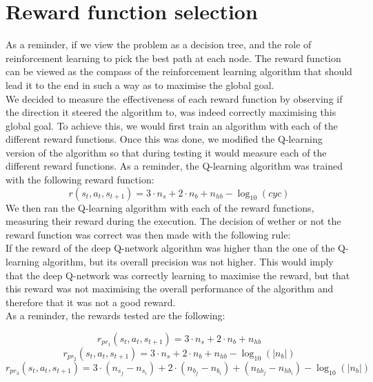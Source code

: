 \section{Reward function selection}
As a reminder, if we view the problem as a decision tree, and the role of reinforcement learning to pick the best path at each node. The reward function can be viewed as the compass of the reinforcement learning algorithm that should lead it to the end in such a way as to maximise the global goal.\\
We decided to measure the effectiveness of each reward function by observing if the direction it steered the algorithm to, was indeed correctly maximising this global goal. To achieve this, we would first train an algorithm with each of the different reward functions. Once this was done, we modified the Q-learning version of the algorithm so that during testing it would measure each of the different reward functions. As a reminder, the Q-learning algorithm was trained with the following reward function:
\begin{equation}
	r(s_t,a_t,s_{t+1}) = 3  \cdot n_s + 2 \cdot n_b + n_{hb} - \log_{10}(cyc)
\end{equation}
We then ran the Q-learning algorithm with each of the reward functions, measuring their reward during the execution. The decision of wether or not the reward function was correct was then made with the following rule:\\
If the reward of the deep Q-network algorithm was higher than the one of the Q-learning algorithm, but its overall precision was not higher. This would imply that the deep Q-network was correctly learning to maximise the reward, but that this reward was not maximising the overall performance of the algorithm and therefore that it was not a good reward.\\
As a reminder, the rewards tested are the following:
 
\begin{equation}
		r_{pr_1}(s_t,a_t,s_{t+1}) = 3  \cdot n_s + 2 \cdot n_b + n_{hb}
\end{equation}
\begin{equation}
		r_{pr_2}(s_t,a_t,s_{t+1}) = 3  \cdot n_s + 2 \cdot n_b + n_{hb} - \log_{10}(|n_b|)
\end{equation}
\begin{equation}
		r_{pr_3}(s_t,a_t,s_{t+1}) = 3  \cdot (n_{s_f} - n_{s_i}) + 2 \cdot (n_{b_f} - n_{b_i}) + (n_{hb_f} - n_{hb_i}) - \log_{10}(|n_b|)
\end{equation}

